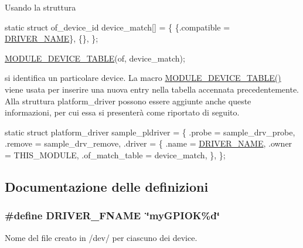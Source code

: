 Usando la struttura


\begin{DoxyCode}
\textcolor{keyword}{static} \textcolor{keyword}{struct }of\_device\_id device\_match[] = \{
        \{.compatible = \hyperlink{group___linux-_driver_ga25634d21648ca7fb7a2aca614bafaaeb}{DRIVER\_NAME}\},
        \{\},
\};

\hyperlink{group___linux-_driver_gaf33e020610cd80a1cfa2ed79b512b841}{MODULE\_DEVICE\_TABLE}(of, device\_match);
\end{DoxyCode}


si identifica un particolare device. La macro \hyperlink{group___linux-_driver_gaf33e020610cd80a1cfa2ed79b512b841}{M\+O\+D\+U\+L\+E\+\_\+\+D\+E\+V\+I\+C\+E\+\_\+\+T\+A\+B\+L\+E()} viene usata per inserire una nuova entry nella tabella accennata precedentemente. Alla struttura platform\+\_\+driver possono essere aggiunte anche queste informazioni, per cui essa si presenterà come riportato di seguito.


\begin{DoxyCode}
\textcolor{keyword}{static} \textcolor{keyword}{struct }platform\_driver sample\_pldriver = \{
    .probe  = sample\_drv\_probe,
    .remove = sample\_drv\_remove,
    .driver = \{
        .name  = \hyperlink{group___linux-_driver_ga25634d21648ca7fb7a2aca614bafaaeb}{DRIVER\_NAME},
        .owner = THIS\_MODULE,
        .of\_match\_table = device\_match,
    \},
\};
\end{DoxyCode}
 

\subsection{Documentazione delle definizioni}
\hypertarget{group___linux-_driver_ga4fa7cb23649a4090e79e2610b7ba0a93}{
\subsubsection[{D\+R\+I\+V\+E\+R\+\_\+\+F\+N\+A\+M\+E}]{\setlength{\rightskip}{0pt plus 5cm}\#define D\+R\+I\+V\+E\+R\+\_\+\+F\+N\+A\+M\+E~\char`\"{}my\+G\+P\+I\+O\+K\%d\char`\"{}}}\label{group___linux-_driver_ga4fa7cb23649a4090e79e2610b7ba0a93}


Nome del file creato in /dev/ per ciascuno dei device. 

